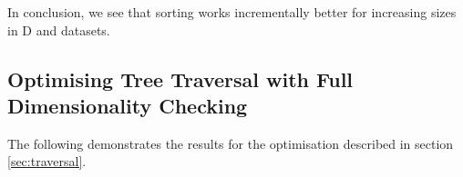 









In conclusion, we see that sorting works incrementally better for increasing sizes in D and datasets. 


\subsection{Optimising Tree Traversal with Full Dimensionality Checking}
\label{sec:evaltrav}

The following demonstrates the results for the optimisation described in section \ref{sec:traversal}. 


